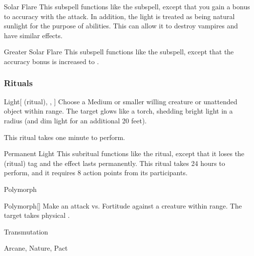\begin{ability}[\nth{4}]{Solar Flare}
This subspell functions like the  subspell, except that you gain a  bonus to accuracy with the attack.
In addition, the light is treated as being natural sunlight for the purpose of abilities.
This can allow it to destroy vampires and have similar effects.
\end{ability}
\vspace{0.25em}



\begin{ability}[\nth{7}]{Greater Solar Flare}
This subspell functions like the  subspell, except that the accuracy bonus is increased to .
\end{ability}
\vspace{0.25em}



\subsubsection{Rituals}


\begin{ability}[\nth{1}]{Light}[ (ritual), , ]
Choose a Medium or smaller willing creature or unattended object within \rngclose range.
The target glows like a torch, shedding bright light in a \areamed radius (and dim light for an additional 20 feet).

This ritual takes one minute to perform.
\end{ability}
\vspace{0.25em}



\begin{ability}[\nth{2}]{Permanent Light}
This subritual functions like the  ritual, except that it loses the  (ritual) tag and the effect lasts permanently.
This ritual takes 24 hours to perform, and it requires 8 action points from its participants.
\end{ability}
\vspace{0.25em}


\newpage
\begin{spellsection}{Polymorph}

\begin{spellheader}
\end{spellheader}


\begin{ability}{Polymorph}[]
Make an attack vs. Fortitude against a creature within \rngmed range.
\hit The target takes physical .
\end{ability}




 Transmutation

 Arcane, Nature, Pact
\end{spellsection}



